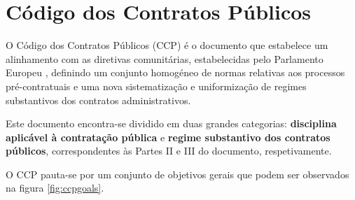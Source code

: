 



\section{Código dos Contratos Públicos}

O Código dos Contratos Públicos (CCP) é o documento que estabelece um alinhamento com as diretivas comunitárias,  estabelecidas pelo Parlamento Europeu \cite{ue_dire}, definindo um conjunto homogéneo de normas relativas aos processos pré-contratuais e uma nova sistematização e uniformização de regimes substantivos dos contratos administrativos. 

Este documento encontra-se dividido em duas grandes categorias: \textbf{disciplina aplicável à contratação pública} e \textbf{regime substantivo dos contratos públicos}, correspondentes às Partes II e III do documento, respetivamente.

O CCP pauta-se por um conjunto de objetivos gerais que podem ser observados na figura \ref{fig:ccpgoals}.

